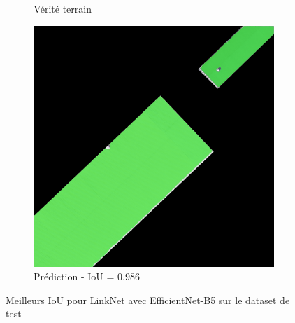 \begin{figure}[H]
\begin{subfigure}{0.32\textwidth}
    \caption{Vérité terrain}
\end{subfigure}
\hfill
\begin{subfigure}{0.32\textwidth}
    \includegraphics[width=\textwidth]{02-main//figures/ch4/kfold_ensembles/linknet_timm-efficientnet-b5/best_cases/best_2_iou0.986_24961121_tile_15_10_cc6553_overlay_pred.png}
    \caption{Prédiction - IoU = 0.986}
\end{subfigure}

\caption{Meilleurs IoU pour LinkNet avec EfficientNet-B5 sur le dataset de test}
\label{fig:linknet_efficientnet_b5_best_cases}
\end{figure}


